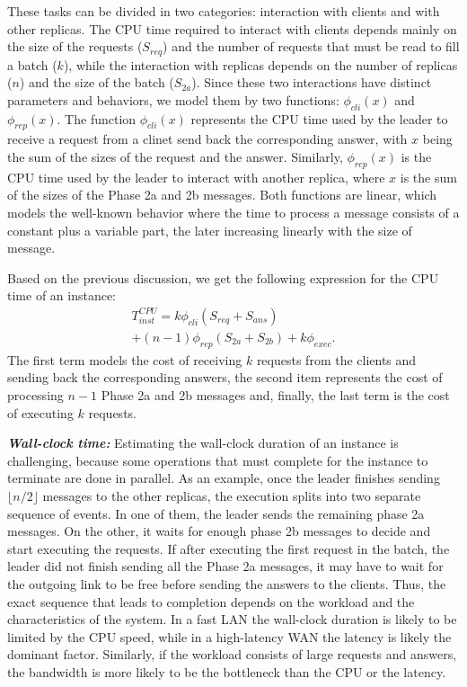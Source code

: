 \documentclass[10pt,preprint]{sigplanconf}
\begin{document}
These tasks can be divided in two categories: interaction with clients and with other replicas. The CPU time required to interact with clients depends mainly on the size of the requests ($S_{req}$) and the number of requests that must be read to fill a batch ($k$), while the interaction with replicas depends on the number of replicas ($n$) and the size of the batch ($S_{2a}$). Since these two interactions have distinct parameters and behaviors, we model them by two functions: $\phi_{cli}(x)$ and $\phi_{rep}(x)$. The function $\phi_{cli}(x)$ represents the CPU time used by the leader to receive a request from a clinet send back the corresponding answer, with $x$ being the sum of the sizes of the request and the answer. Similarly, $\phi_{rep}(x)$ is the CPU time used by the leader to interact with another replica, where $x$ is the sum of the sizes of the Phase 2a and 2b messages. Both functions are linear, which models the well-known behavior where the time to process a message consists of a constant plus a variable part, the later increasing linearly with the size of message.

Based on the previous discussion, we get the following expression for the CPU time of an instance:
\begin{multline}
T^{CPU}_{inst} = k\phi_{cli}(S_{req}+S_{ans}) \\
+(n-1)\phi_{rep}(S_{2a}+S_{2b})+k\phi_{exec}.
\end{multline}
The first term models the cost of receiving $k$ requests from the clients and sending back the corresponding answers, the second item represents the cost of processing $n-1$ Phase 2a and 2b messages and, finally, the last term is the cost of executing $k$ requests.

\textbf{\emph{Wall-clock time:}} Estimating the wall-clock duration of an instance is challenging, because some operations that must complete for the instance to terminate are done in parallel. As an example, once the leader finishes sending $\lfloor n/2 \rfloor$ messages to the other replicas, the execution splits into two separate sequence of events. In one of them, the leader sends the remaining phase 2a messages. On the other, it waits for enough phase 2b messages to decide and start executing the requests. If after executing the first request in the batch, the leader did not finish sending all the Phase 2a messages, it may have to wait for the outgoing link to be free before sending the answers to the clients. Thus, the exact sequence that leads to completion depends on the workload and the characteristics of the system. In a fast LAN the wall-clock duration is likely to be limited by the CPU speed, while in a high-latency WAN the latency is likely the dominant factor. Similarly, if the workload consists of large requests and answers, the bandwidth is more likely to be the bottleneck than the CPU or the latency.
\end{document}
